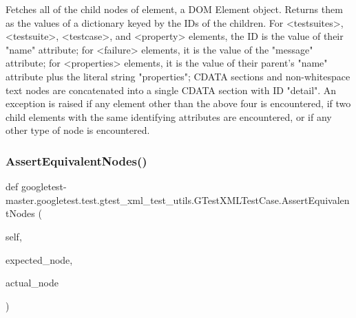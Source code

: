 \begin{DoxyVerb}Fetches all of the child nodes of element, a DOM Element object.
Returns them as the values of a dictionary keyed by the IDs of the
children.  For <testsuites>, <testsuite>, <testcase>, and <property>
elements, the ID is the value of their "name" attribute; for <failure>
elements, it is the value of the "message" attribute; for <properties>
elements, it is the value of their parent's "name" attribute plus the
literal string "properties"; CDATA sections and non-whitespace
text nodes are concatenated into a single CDATA section with ID
"detail".  An exception is raised if any element other than the above
four is encountered, if two child elements with the same identifying
attributes are encountered, or if any other type of node is encountered.
\end{DoxyVerb}
 \mbox{\label{classgoogletest-master_1_1googletest_1_1test_1_1gtest__xml__test__utils_1_1_g_test_x_m_l_test_case_a393b1518e95e01d508c25850ad0bc0f2}} 
\subsubsection{\texorpdfstring{AssertEquivalentNodes()}{AssertEquivalentNodes()}}
{\footnotesize\ttfamily def googletest-\/master.\+googletest.\+test.\+gtest\+\_\+xml\+\_\+test\+\_\+utils.\+G\+Test\+X\+M\+L\+Test\+Case.\+Assert\+Equivalent\+Nodes (\begin{DoxyParamCaption}\item[{}]{self,  }\item[{}]{expected\+\_\+node,  }\item[{}]{actual\+\_\+node }\end{DoxyParamCaption})}

